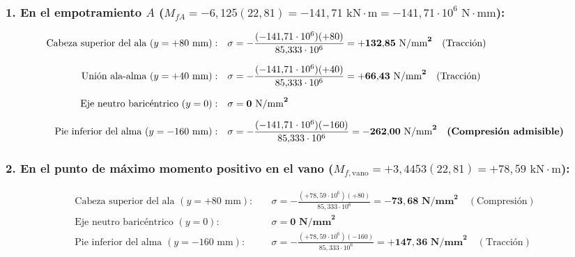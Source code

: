 \subsubsection*{1. En el empotramiento $A$ ($M_{fA} = -6{,}125(22{,}81) = -141{,}71\text{ kN}\cdot\text{m} = -141{,}71 \cdot 10^6\text{ N}\cdot\text{mm}$):}
\begin{align}
    \text{Cabeza superior del ala } (y = +80\text{ mm}): & \quad \sigma = -\frac{(-141{,}71 \cdot 10^6)(+80)}{85{,}333 \cdot 10^6} = \mathbf{+132{,}85\text{ N/mm}^2} \quad (\text{Tracción}) \\[6pt]
    \text{Unión ala-alma } (y = +40\text{ mm}):          & \quad \sigma = -\frac{(-141{,}71 \cdot 10^6)(+40)}{85{,}333 \cdot 10^6} = \mathbf{+66{,}43\text{ N/mm}^2} \quad (\text{Tracción}) \\[6pt]
    \text{Eje neutro baricéntrico } (y = 0):             & \quad \sigma = \mathbf{0\text{ N/mm}^2} \\[6pt]
    \text{Pie inferior del alma } (y = -160\text{ mm}):  & \quad \sigma = -\frac{(-141{,}71 \cdot 10^6)(-160)}{85{,}333 \cdot 10^6} = \mathbf{-262{,}00\text{ N/mm}^2} \quad \text{\textbf{(Compresión admisible)}}
\end{align}

\subsubsection*{2. En el punto de máximo momento positivo en el vano ($M_{f,\text{vano}} = +3{,}4453(22{,}81) = +78{,}59\text{ kN}\cdot\text{m}$):}
\begin{align}
    \text{Cabeza superior del ala } (y = +80\text{ mm}): & \quad \sigma = -\frac{(+78{,}59 \cdot 10^6)(+80)}{85{,}333 \cdot 10^6} = \mathbf{-73{,}68\text{ N/mm}^2} \quad (\text{Compresión}) \\[6pt]
    \text{Eje neutro baricéntrico } (y = 0):             & \quad \sigma = \mathbf{0\text{ N/mm}^2} \\[6pt]
    \text{Pie inferior del alma } (y = -160\text{ mm}):  & \quad \sigma = -\frac{(+78{,}59 \cdot 10^6)(-160)}{85{,}333 \cdot 10^6} = \mathbf{+147{,}36\text{ N/mm}^2} \quad (\text{Tracción})
\end{align}

